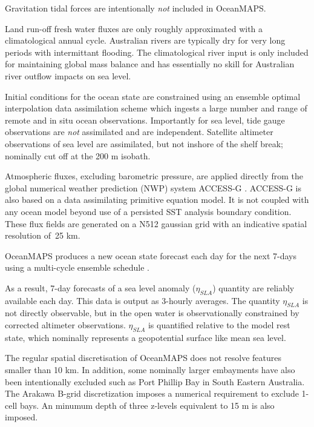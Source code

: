 Gravitation tidal forces are intentionally \textit{not} included in OceanMAPS.      


Land run-off fresh water fluxes are only roughly approximated with a climatological annual cycle. 
Australian rivers are typically dry for very long periods with intermittant flooding.   
The climatological river input is only included for maintaining global mass balance and has essentially no skill for Australian river outflow impacts on sea level.    


Initial conditions for the ocean state are constrained using an ensemble optimal interpolation data assimilation scheme \citep{Oke:2008wr} which ingests a large number and range of remote and in situ ocean observations. 
Importantly for sea level, tide gauge observations are \textit{not} assimilated and are independent.   
Satellite altimeter observations of sea level are assimilated, but not inshore of the shelf break; nominally cut off at the 200 m isobath.


Atmospheric fluxes, excluding barometric pressure, are applied directly from the global numerical weather prediction (NWP) system ACCESS-G \citep{BureauofMeterology:C8IaJ2Qq}.
ACCESS-G is also based on a data assimilating primitive equation model.
It is not coupled with any ocean model beyond use of a persisted SST analysis boundary condition.
These flux fields are generated on a N512 gaussian grid with an indicative spatial resolution of~25 km. 

OceanMAPS produces a new ocean state forecast each day for the next 7-days using a multi-cycle ensemble schedule \citep{GaryBBrassington:2013jw}.

As a result, 7-day forecasts of a sea level anomaly ($\eta_{SLA}$) quantity are reliably available each day.  
This data is output as 3-hourly averages.  
The quantity $\eta_{SLA}$ is not directly observable, but in the open water is observationally constrained by corrected altimeter observations.
$\eta_{SLA}$ is quantified relative to the model rest state, which nominally represents a geopotential surface like mean sea level.  

The regular spatial discretisation of OceanMAPS does not resolve features smaller than 10 km.   
In addition, some nominally larger embayments have also been intentionally excluded such as Port Phillip Bay in South Eastern Australia.
The Arakawa B-grid discretization imposes a numerical requirement to exclude 1-cell bays. 
An minumum depth of three z-levels equivalent to 15 m is also imposed.

